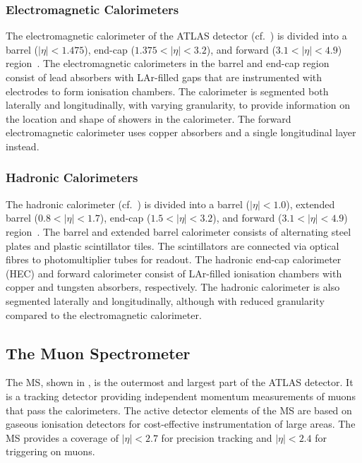 \subsubsection{Electromagnetic Calorimeters}

The electromagnetic calorimeter of the ATLAS detector (cf.\
) is divided into a barrel ($|\eta| < 1.475$),
end-cap ($1.375 < |\eta| < 3.2$), and forward ($3.1 < |\eta| < 4.9$)
region~\cite{PERF-2007-01}. The electromagnetic calorimeters in the barrel and
end-cap region consist of lead absorbers with LAr-filled gaps that are
instrumented with electrodes to form ionisation chambers. The calorimeter is
segmented both laterally and longitudinally, with varying granularity, to
provide information on the location and shape of showers in the calorimeter. The
forward electromagnetic calorimeter uses copper absorbers and a single
longitudinal layer instead.


\subsubsection{Hadronic Calorimeters}

The hadronic calorimeter (cf.\ ) is divided into a
barrel ($|\eta| < 1.0$), extended barrel ($0.8 < |\eta| < 1.7$), end-cap
($1.5 < |\eta| < 3.2$), and forward ($3.1 < |\eta| < 4.9$)
region~\cite{PERF-2007-01}.  The barrel and extended barrel calorimeter consists
of alternating steel plates and plastic scintillator tiles. The scintillators
are connected via optical fibres to photomultiplier tubes for readout. The
hadronic end-cap calorimeter (HEC) and forward calorimeter consist of LAr-filled
ionisation chambers with copper and tungsten absorbers, respectively. The
hadronic calorimeter is also segmented laterally and longitudinally, although
with reduced granularity compared to the electromagnetic calorimeter.


\subsection{The Muon Spectrometer}

The MS, shown in , is the outermost and largest part
of the ATLAS detector. It is a tracking detector providing independent momentum
measurements of muons that pass the calorimeters. The active detector elements
of the MS are based on gaseous ionisation detectors for cost-effective
instrumentation of large areas. The MS provides a coverage of $|\eta| < 2.7$ for
precision tracking and $|\eta| < 2.4$ for triggering on muons.

